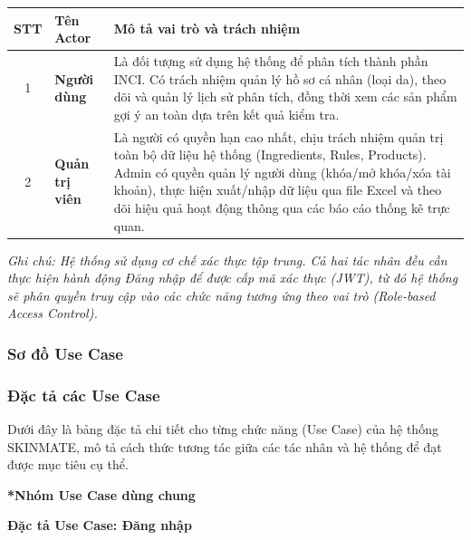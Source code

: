 \documentclass[12pt,a4paper]{article}
\begin{document}
\begin{center}
\renewcommand{\arraystretch}{1.5}
\begin{tabular}{|c|p{3cm}|p{9cm}|}
\hline
\rowcolor{blue!20}
\textbf{STT} & \textbf{Tên Actor} & \textbf{Mô tả vai trò và trách nhiệm} \\ \hline
1 & \textbf{Người dùng} & Là đối tượng sử dụng hệ thống để phân tích thành phần INCI. Có trách nhiệm quản lý hồ sơ cá nhân (loại da), theo dõi và quản lý lịch sử phân tích, đồng thời xem các sản phẩm gợi ý an toàn dựa trên kết quả kiểm tra. \\ \hline
2 & \textbf{Quản trị viên} & Là người có quyền hạn cao nhất, chịu trách nhiệm quản trị toàn bộ dữ liệu hệ thống (Ingredients, Rules, Products). Admin có quyền quản lý người dùng (khóa/mở khóa/xóa tài khoản), thực hiện xuất/nhập dữ liệu qua file Excel và theo dõi hiệu quả hoạt động thông qua các báo cáo thống kê trực quan. \\ \hline
\end{tabular}
\end{center}

\textit{Ghi chú: Hệ thống sử dụng cơ chế xác thực tập trung. Cả hai tác nhân đều cần thực hiện hành động Đăng nhập để được cấp mã xác thực (JWT), từ đó hệ thống sẽ phân quyền truy cập vào các chức năng tương ứng theo vai trò (Role-based Access Control).}


\subsubsection{Sơ đồ Use Case}

\subsubsection{Đặc tả các Use Case}

Dưới đây là bảng đặc tả chi tiết cho từng chức năng (Use Case) của hệ thống SKINMATE, mô tả cách thức tương tác giữa các tác nhân và hệ thống để đạt được mục tiêu cụ thể.

\vspace{0.5cm}

\textbf{*Nhóm Use Case dùng chung}


\vspace{0.5cm}
\textbf{Đặc tả Use Case: Đăng nhập}
\end{document}
